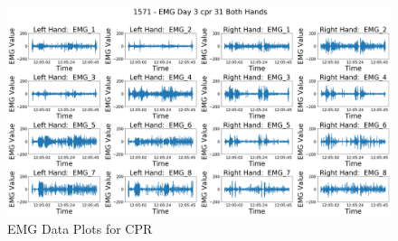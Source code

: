 \begin{figure}[!h]
	\centering
	\includegraphics[width=\linewidth]{pictures/1571_EMG_Day3_cpr_31}
	\caption{EMG Data Plots for CPR}
	\label{fig:1571emgday3cpr31}
\end{figure}

